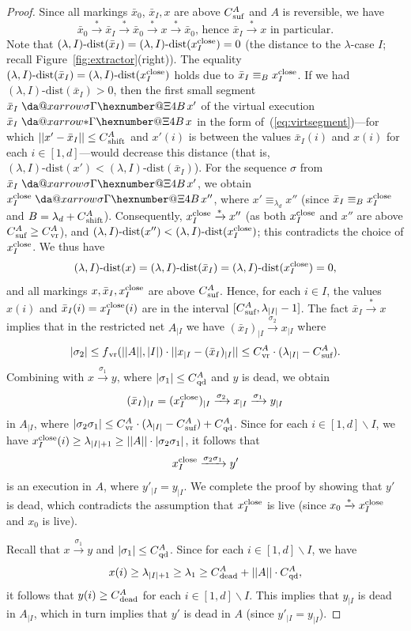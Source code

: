 \documentclass[11pt,a4paper]{amsart}
\makeatletter
\newcommand{\step}[1]{\mathrel{\xrightarrow{#1}}}
\newcommand{\reach}{\step{*}}
\newcommand{\virtual}[1]{\mathrel{\xdashrightarrow{#1}}\hspace{-0.3em}}
\newcommand{\vreach}{\virtual{*}}
\newcommand{\dist}[3]{(#1,#2)\text{-dist}(#3)}
\newcommand{\nnorm}[1]{||#1||}
\newcommand{\vr}{{}_\textnormal{vr}}
\newcommand{\dead}{{}_\textnormal{dead}}
\newcommand{\suf}{{}_\textnormal{suf}}
\newcommand{\shift}{{}_\textnormal{shift}}
\newcommand{\close}{\textnormal{close}}
\newcommand{\qd}{{}_\textnormal{qd}}
\newcommand{\restr}[1]{_{|{#1}}}
\newcommand*{\da@rightarrow}{\mathchar"0\hexnumber@\symAMSa 4B }
\newcommand*{\xdashrightarrow}[2][]{%
  \mathrel{%
    \mathpalette{\da@xarrow{#1}{#2}{}\da@rightarrow{\,}{}}{}%
  }%
}
\newcommand*{\da@xarrow}[7]{%
  \sbox0{$\ifx#7\scriptstyle\scriptscriptstyle\else\scriptstyle\fi#5#1#6\m@th$}%
  \sbox2{$\ifx#7\scriptstyle\scriptscriptstyle\else\scriptstyle\fi#5#2#6\m@th$}%
  \sbox4{$#7\dabar@\m@th$}%
  \dimen@=\wd0 %
  \ifdim\wd2 >\dimen@
    \dimen@=\wd2 %
  \fi
  \count@=2 %
  \def\da@bars{\dabar@\dabar@}%
  \@whiledim\count@\wd4<\dimen@\do{%
    \advance\count@\@ne
    \expandafter\def\expandafter\da@bars\expandafter{%
      \da@bars
      \dabar@ 
    }%
  }%
  \mathrel{#3}%
  \mathrel{%
    \mathop{\da@bars}\limits
    \ifx\\#1\\%
    \else
      _{\copy0}%
    \fi
    \ifx\\#2\\%
    \else
      ^{\copy2}%
    \fi
  }%
  \mathrel{#4}%
}
\theoremstyle{plain}
\theoremstyle{definition}
\theoremstyle{defC}
\theoremstyle{thmC}
\makeatother
\begin{document}
\begin{proof}
	Since all markings $\bar{x}_0$, $\bar{x}_I, x$ are above $C\suf^A$
and $A$ is
	reversible, we have 
	\[\bar{x}_0\reach \bar{x}_I\reach \bar{x}_0\reach
	x\reach\bar{x}_0\text{, hence }\bar{x}_I\reach x\text{ in
	particular.}\]
Note that $\dist{\lambda}{I}{\bar{x}_I}=\dist{\lambda}{I}{x^\close_I}=0$
(the distance to the $\lambda$-case $I$;
recall Figure~\ref{fig:extractor}(right)).
	The equality
	$\dist{\lambda}{I}{\bar{x}_I}=\dist{\lambda}{I}{x^\close_I}$
holds due to $\bar{x}_I\equiv_{B}x^\close_I$. If we had 
	$\dist{\lambda}{I}{\bar{x}_I}>0$, then 
	the first small segment $\bar{x}_I\virtual{\sigma}x'$
	of the virtual execution
	$\bar{x}_I\vreach x$ in the form
	of~(\ref{eq:virtsegment})---for which
	$\nnorm{x'-\bar{x}_I}\leq C\shift^A$ and 
	$x'(i)$ is between the values $\bar{x}_I(i)$ and $x(i)$ for
	each
	$i\in[1,d]$---would decrease this distance 
(that is, $\dist{\lambda}{I}{x'}<\dist{\lambda}{I}{\bar{x}_I}$).
For the sequence $\sigma$ from $\bar{x}_I\virtual{\sigma}x'$, we obtain 
 $x^\close_I\virtual{\sigma}x''$, where  $x'\equiv_{\lambda_d}x''$
 (since  $\bar{x}_I\equiv_{B}x^\close_I$ and
$B=\lambda_d+C\shift^A$). Consequently, 
$x^\close_I\reach x''$ (as both $x^\close_I$ and $x''$ are above
$C\suf^A\geq C\vr^A$), 
and
$\dist{\lambda}{I}{x''}<\dist{\lambda}{I}{x^\close_I}$; this contradicts the choice
of  $x^\close_I$.
We thus have
\[\dist{\lambda}{I}{x}=\dist{\lambda}{I}{\bar{x}_I}=\dist{\lambda}{I}{x^\close_I}=0,\]
and all markings $x,\bar{x}_I,x^\close_I$ are above $C\suf^A$.
Hence, for each $i\in I$, the values $x(i)$ and
$\bar{x}_I(i)=x^\close_I(i)$ are in the interval
$[C\suf^A,\lambda_{|I|}-1]$.
The fact 
$\bar{x}_I\reach x$ implies that in the restricted net $A\restr{I}$ we
have 
$(\bar{x}_I)\restr{I}\step{\sigma_2}x\restr{I}$ where 
\[|\sigma_2|\leq f\vr(\nnorm{A},|I|)\cdot
\nnorm{x\restr{I}-(\bar{x}_I)\restr{I}}\leq C\vr^A\cdot
(\lambda_{|I|}-C\suf^A).\]
Combining with $x\step{\sigma_1}y$, where $|\sigma_1|\leq
C\qd^A$ and $y$ is dead, we obtain
\[(\bar{x}_{I})\restr{I}=(x^\close_{I})\restr{I}\step{\sigma_2}
x\restr{I}\step{\sigma_1}y\restr{I}\]
in $A\restr{I}$, where $|\sigma_2\sigma_1|\leq C\vr^{A}\cdot
(\lambda_{|I|}-C\suf^A)+C\qd^A$.
Since for each $i\in [1,d]\smallsetminus I$, we have
$x^\close_{I}(i)\geq\lambda_{|I|+1}\geq \nnorm{A}\cdot
|\sigma_2\sigma_1|$, it follows that 
\[x^\close_{I}\step{\sigma_2\sigma_1}y'\]
is an execution in $A$, where $y'\restr{I}=y\restr{I}$.
We complete the proof by showing that $y'$ is dead, which
contradicts the assumption that $x^\close_{I}$ is live (since 
$x_0\reach x^\close_{I}$ and $x_0$ is live).

Recall that $x\step{\sigma_1}y$ and $|\sigma_1|\leq C\qd^A$.
Since for each $i\in [1,d]\smallsetminus I$, we have 
\[x(i)\geq
\lambda_{|I|+1}\geq \lambda_1\geq C\dead^A+ \nnorm{A}\cdot C\qd^A,\]
it follows that 
$y(i)\geq C\dead^A$ for each  $i\in [1,d]\smallsetminus I$. This implies
that $y\restr{I}$ is dead in $A\restr{I}$, which in turn
implies that $y'$ is dead in $A$ (since
$y'\restr{I}=y\restr{I}$).
\end{proof}
\end{document}
